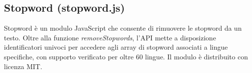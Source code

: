 \subsection*{Stopword (stopword.js)}

\par Stopword è un modulo JavaScript che consente di rimuovere le \gls{stopword} da un testo. Oltre alla funzione \textit{removeStopwords}, l’API mette a disposizione identificatori univoci per accedere agli array di stopword associati a lingue specifiche, con supporto verificato per oltre 60 lingue. Il modulo è distribuito con licenza MIT.